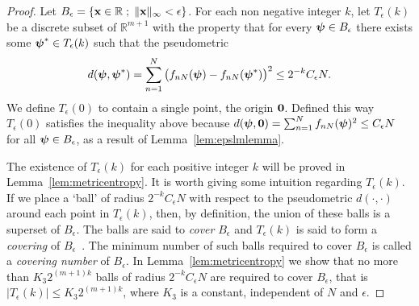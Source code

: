 \documentclass[aap,preprint]{imsart}
\newcommand{\reals}{{\mathbb R}}
\newcommand{\expect}{{\mathbb E}}
\renewcommand{\mid}{\; ; \;}
\newcommand{\abs}[1]{\left\vert #1 \right\vert}
\begin{document}
\begin{proof}  Let $B_\epsilon = \{\xbf \in \reals \mid \|\xbf\|_\infty < \epsilon \}$.
For each non negative integer $k$, let $T_\epsilon(k)$ be a discrete subset of $\reals^{m+1}$ with the property that for every $\boldsymbol{\psi} \in B_\epsilon$ there exists some $\boldsymbol{\psi}^* \in T_\epsilon(k)$ such that the pseudometric
\[
d(\boldsymbol{\psi}, \boldsymbol{\psi}^*) = \sum_{n = 1}^N \big( f_{nN}(\boldsymbol{\psi}) - f_{nN}(\boldsymbol{\psi}^*) \big)^2 \leq 2^{-k} C_\epsilon N.
\]
We define $T_\epsilon(0)$ to contain a single point, the origin $\boldsymbol{0}$.  Defined this way $T_\epsilon(0)$ satisfies the inequality above because $d(\boldsymbol{\psi}, \boldsymbol{0}) = \sum_{n = 1}^N f_{nN}(\boldsymbol{\psi})^2  \leq C_\epsilon N$ for all $\boldsymbol{\psi} \in B_\epsilon$, as a result of Lemma~\ref{lem:epslmlemma}.

The existence of $T_\epsilon(k)$ for each positive integer $k$ will be proved in Lemma~\ref{lem:metricentropy}.  It is worth giving some intuition regarding $T_\epsilon(k)$.  If we place a `ball' of radius $2^{-k} C_\epsilon N$  with respect to the pseudometric $d(\cdot, \cdot)$ around each point in $T_\epsilon(k)$, then, by definition, the union of these balls is a superset of $B_\epsilon$.  The balls are said to \emph{cover} $B_\epsilon$ and $T_\epsilon(k)$ is said to form a \emph{covering} of $B_\epsilon$~\cite[Section 1.2]{Dudley_unif_central_lim_th_1999}.  The minimum number of such balls required to cover $B_\epsilon$ is called a \emph{covering number} of $B_\epsilon$.  In Lemma~\ref{lem:metricentropy} we show that no more than $K_3 2^{(m+1)k}$ balls of radius $2^{-k} C_\epsilon N$ are required to cover $B_\epsilon$, that is $\abs{T_\epsilon(k)} \leq K_3 2^{(m+1)k}$, where $K_3$ is a constant, independent of $N$ and $\epsilon$.  %


\end{proof}
\end{document}
